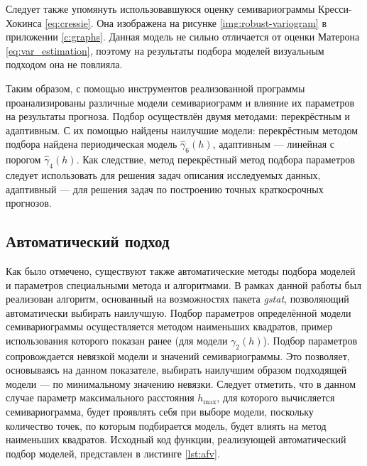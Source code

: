 
Следует также упомянуть использовавшуюся оценку семивариограммы Кресси-Хокинса \eqref{eq:cressie}. Она изображена на рисунке \ref{img:robust-variogram} в приложении \ref{c:graphs}. Данная модель не сильно отличается от оценки Матерона \eqref{eq:var_estimation}, поэтому на результаты подбора моделей визуальным подходом она не повлияла.

Таким образом, с помощью инструментов реализованной программы проанализированы различные модели семивариограмм и влияние их параметров на результаты прогноза. Подбор осуществлён двумя методами: перекрёстным и адаптивным. С их помощью найдены наилучшие модели: перекрёстным методом подбора найдена периодическая модель $ \widehat{\gamma}_6(h) $, адаптивным --- линейная с порогом $ \widehat{\gamma}_4(h) $. Как следствие, метод перекрёстный метод подбора параметров следует использовать для решения задач описания исследуемых данных, адаптивный --- для решения задач по построению точных краткосрочных прогнозов.


\subsection{Автоматический подход} %
\label{sec:autovar}


Как было отмечено, существуют также автоматические методы подбора моделей и параметров специальными метода и алгоритмами. В рамках данной работы был реализован алгоритм, основанный на возможностях пакета \textit{gstat}, позволяющий автоматически выбирать наилучшую. Подбор параметров определённой модели семивариограммы осуществляется методом наименьших квадратов, пример использования которого показан ранее (для модели $ \gamma_2(h) $). Подбор параметров сопровождается невязкой модели и значений семивариограммы. Это позволяет, основываясь на данном показателе, выбирать наилучшим образом подходящей модели --- по минимальному значению невязки. Следует отметить, что в данном случае параметр максимального расстояния $ h_{\text{max}} $, для которого вычисляется семивариограмма, будет проявлять себя при выборе модели, поскольку количество точек, по которым подбирается модель, будет влиять на метод наименьших квадратов. Исходный код функции, реализующей автоматический подбор моделей, представлен в листинге \ref{lst:afv}.

